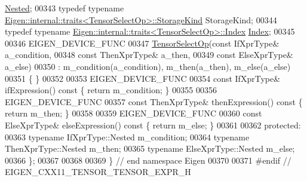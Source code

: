 \begin{DoxyCode}
       \hyperlink{class_eigen_1_1internal_1_1_tensor_lazy_evaluator_writable}{Nested};
00343     \textcolor{keyword}{typedef} \textcolor{keyword}{typename} \hyperlink{struct_eigen_1_1internal_1_1traits}{Eigen::internal::traits<TensorSelectOp>::StorageKind}
       StorageKind;
00344     \textcolor{keyword}{typedef} \textcolor{keyword}{typename} \hyperlink{struct_eigen_1_1internal_1_1traits}{Eigen::internal::traits<TensorSelectOp>::Index}
       \hyperlink{namespace_eigen_a62e77e0933482dafde8fe197d9a2cfde}{Index};
00345 
00346     EIGEN\_DEVICE\_FUNC
00347     \hyperlink{class_eigen_1_1_tensor_select_op}{TensorSelectOp}(\textcolor{keyword}{const} IfXprType& a\_condition,
00348                    \textcolor{keyword}{const} ThenXprType& a\_then,
00349                    \textcolor{keyword}{const} ElseXprType& a\_else)
00350       : m\_condition(a\_condition), m\_then(a\_then), m\_else(a\_else)
00351     \{ \}
00352 
00353     EIGEN\_DEVICE\_FUNC
00354     \textcolor{keyword}{const} IfXprType& ifExpression()\textcolor{keyword}{ const }\{ \textcolor{keywordflow}{return} m\_condition; \}
00355 
00356     EIGEN\_DEVICE\_FUNC
00357     \textcolor{keyword}{const} ThenXprType& thenExpression()\textcolor{keyword}{ const }\{ \textcolor{keywordflow}{return} m\_then; \}
00358 
00359     EIGEN\_DEVICE\_FUNC
00360     \textcolor{keyword}{const} ElseXprType& elseExpression()\textcolor{keyword}{ const }\{ \textcolor{keywordflow}{return} m\_else; \}
00361 
00362   \textcolor{keyword}{protected}:
00363     \textcolor{keyword}{typename} IfXprType::Nested m\_condition;
00364     \textcolor{keyword}{typename} ThenXprType::Nested m\_then;
00365     \textcolor{keyword}{typename} ElseXprType::Nested m\_else;
00366 \};
00367 
00368 
00369 \} \textcolor{comment}{// end namespace Eigen}
00370 
00371 \textcolor{preprocessor}{#endif // EIGEN\_CXX11\_TENSOR\_TENSOR\_EXPR\_H}
\end{DoxyCode}
